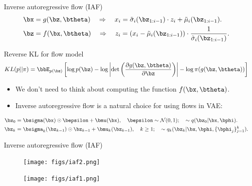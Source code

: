 \begin{frame}{Inverse autoregressive flow (IAF)}
	\vspace{-0.3cm}
	\begin{align*}
		\bx &= g(\bz, \btheta) \quad \Rightarrow \quad x_i = \tilde{\sigma}_i (\bz_{1:i-1}) \cdot z_i + \tilde{\mu}_i(\bz_{1:i-1}). \\
		\bz &= f(\bx, \btheta) \quad \Rightarrow \quad z_i = \left(x_i - \tilde{\mu}_i(\bz_{1:i-1}) \right) \cdot \frac{1}{\tilde{\sigma}_i (\bz_{1:i-1})}.
	\end{align*}
	\vspace{-0.5cm}
	\begin{block}{Reverse KL for flow model}
  		\vspace{-0.5cm}
		\[
			KL(p || \pi)  = \bbE_{p(\bz)} \left[  \log p(\bz) - \log \left|\det \left( \frac{\partial g(\bz, \btheta)}{\partial \bz} \right) \right| - \log \pi(g(\bz, \btheta)) \right]
		\]
		\vspace{-0.3cm}
	\end{block}
	\begin{itemize}
	\item We don’t need to think about computing the function $f(\bx, \btheta)$.
	\item Inverse autoregressive flow is a natural choice for using flows in VAE:
	\end{itemize}
	\vspace{-0.3cm}
	\begin{align*}
		\bz_0 &= \bsigma(\bx) \odot \bepsilon + \bmu(\bx), \quad \bepsilon \sim \mathcal{N}(0, 1); \quad  \sim q(\bz_0 | \bx, \bphi). \\
		\bz_k &= \bsigma_k(\bz_{k - 1}) \odot \bz_{k-1} + \bmu_k(\bz_{k - 1}), \quad k \geq 1; \quad  \sim q_k(\bz_k | \bx, \bphi, \{\bphi_j\}_{j=1}^k).
	\end{align*}
\end{frame}
\begin{frame}{Inverse autoregressive flow (IAF)}
	\begin{figure}
		\texttt{[image: figs/iaf2.png]}
	\end{figure}
	\begin{figure}
		\texttt{[image: figs/iaf1.png]}
	\end{figure}

\end{frame}
